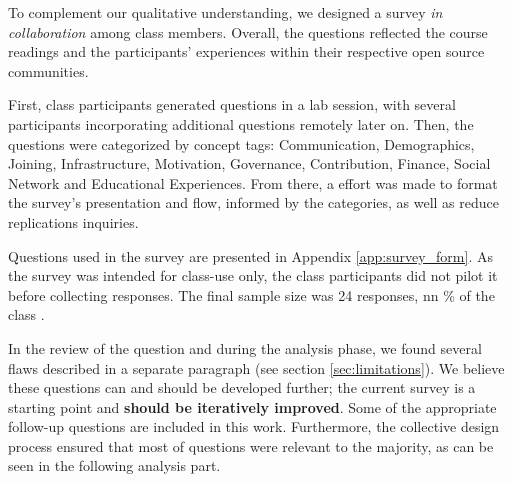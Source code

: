 

To complement our qualitative understanding, we designed a survey {\it in collaboration} among class members. Overall, the questions reflected the course  readings and the participants' experiences within their respective open source communities. 

First, class participants generated questions in a lab session, with several participants incorporating additional questions remotely later on.  Then, the questions were categorized by concept tags: Communication, Demographics, Joining, Infrastructure, Motivation, Governance, Contribution, Finance, Social Network and Educational Experiences. From there, a effort was made to format the survey's  presentation and flow, informed by the categories, as well as reduce replications inquiries.

Questions used in the survey  are presented in Appendix \ref{app:survey_form}. As the survey was intended for class-use only, the class participants did not pilot it before collecting  responses. The final sample size was 24 responses, nn \% of the class .

In the review of the question and during the analysis phase, we found several flaws described in a separate paragraph (see section \ref{sec:limitations}). We believe these questions can and should be developed further; the current survey is a starting point and {\bf should be iteratively improved}. Some of the appropriate follow-up questions are included in this work. Furthermore, the collective design process ensured that most of questions were relevant to the majority, as can be seen in the following analysis part.